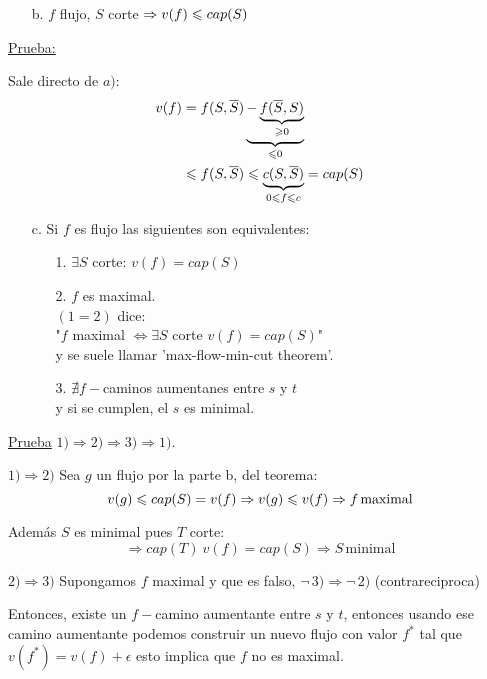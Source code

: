 \documentclass[12pt,a4paper]{article}
\begin{document}
\begin{itemize}
    \item [b.] $f$ flujo, $S$ corte $\Rightarrow v(f) \leqslant cap(S)$
\end{itemize}
\underline{Prueba:}

Sale directo de $a)$:
\begin{align*}
    v(f) &= f(S,\overline{S}) \underbrace{- \underbrace{f(\overline{S},S)}_{\geqslant 0}}_{\leqslant0}\\
    &\leqslant f(S,\overline{S}) \leqslant \underbrace{c(S,\overline{S})}_{0\leqslant f \leqslant c} = cap(S)\\
\end{align*}

\begin{itemize}
    \item [c.] Si $f$ es flujo las siguientes son equivalentes:
    \begin{itemize}
        \item [1.] $\exists S$ corte: $v(f) = cap(S)$
        \item [2.] $f$ es maximal.\\
        $(1=2)$ dice: \\
        "$f$ maximal $\Longleftrightarrow \exists S$ corte $v(f) = cap(S)$"\\
        y se suele llamar 'max-flow-min-cut theorem'.
        \item [3.] $\nexists f-$caminos aumentanes entre $s$ y $t$\\
        y si se cumplen, el $s$ es minimal.
    \end{itemize}
\end{itemize}

\underline{Prueba} $1) \Rightarrow 2) \Rightarrow 3) \Rightarrow 1)$.
\medskip

$1) \Rightarrow 2)$ Sea $g$ un flujo por la parte b, del teorema:
$$v(g) \leqslant cap(S) = v(f) \Rightarrow v(g) \leqslant v(f) \Rightarrow f\, \text{maximal}$$

Además $S$ es minimal pues $T$ corte:
$$\Rightarrow cap(T) \> v(f) = cap(S) \Rightarrow S\, \text{minimal}$$

$2) \Rightarrow 3)$ Supongamos $f$ maximal y que es falso, $\lnot\, 3) \Rightarrow \lnot\, 2)$ (contrareciproca)
\medskip

Entonces, existe un $f-$camino aumentante entre $s$ y $t$, entonces usando ese camino aumentante 
podemos construir un nuevo flujo con valor $f^{*}$ tal que $v(f^{*}) = v(f) + \epsilon$ 
esto implica que $f$ no es maximal.
\medskip
\end{document}
